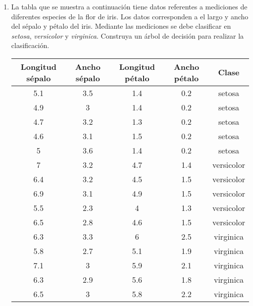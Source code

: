 \documentclass[
10pt, %
a4paper, %
]{article}
\begin{document}
\begin{enumerate}
    \item La tabla que se muestra a continuación tiene datos referentes a mediciones de diferentes especies de la flor de 
    iris\cite{scikit-learn}. Los datos corresponden a el largo y ancho del sépalo y pétalo del iris. Mediante las mediciones se debe 
    clasificar en \textit{setosa}, \textit{versicolor} y \textit{virginica}. Construya un árbol de decisión para realizar 
	  la clasificación.
	\begin{table}[H]
		\centering
		\begin{tabular}{ccccc}
			\toprule
			Longitud sépalo & Ancho sépalo & Longitud pétalo & Ancho pétalo & Clase \\ \midrule
			5.1 & 3.5 & 1.4 & 0.2 & setosa \\
			4.9 & 3   & 1.4 & 0.2 & setosa \\
			4.7 & 3.2 & 1.3 & 0.2 & setosa \\
			4.6 & 3.1 & 1.5 & 0.2 & setosa \\
			5   & 3.6 & 1.4 & 0.2 & setosa \\
			7   & 3.2 & 4.7 & 1.4 & versicolor \\
			6.4 & 3.2 & 4.5 & 1.5 & versicolor \\
			6.9 & 3.1 & 4.9 & 1.5 & versicolor \\
			5.5 & 2.3 & 4   & 1.3 & versicolor \\
			6.5 & 2.8 & 4.6 & 1.5 & versicolor \\
			6.3 & 3.3 & 6   & 2.5 & virginica \\
			5.8 & 2.7 & 5.1 & 1.9 & virginica \\
			7.1 & 3   & 5.9 & 2.1 & virginica \\
			6.3 & 2.9 & 5.6 & 1.8 & virginica \\
			6.5 & 3   & 5.8 & 2.2 & virginica \\
			\bottomrule
		\end{tabular}
	\end{table}


\end{enumerate}
\end{document}
